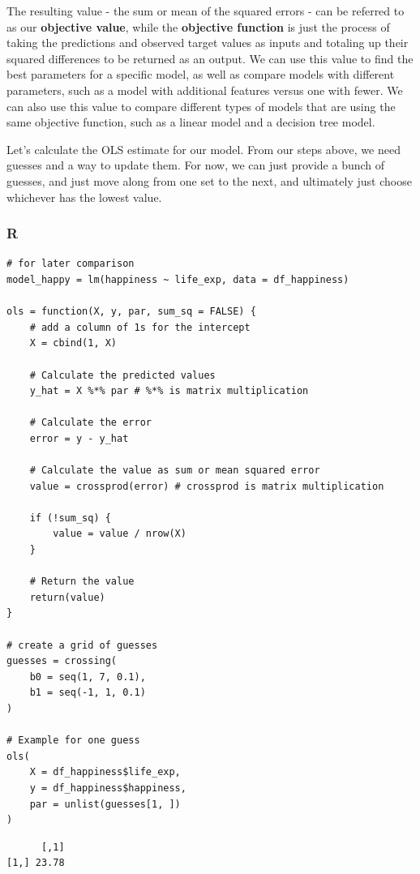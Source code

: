 \documentclass[
  letterpaper,
]{krantz}
\begin{document}
The resulting value - the sum or mean of the squared errors - can be
referred to as our \textbf{objective value}, while the \textbf{objective
function} is just the process of taking the predictions and observed
target values as inputs and totaling up their squared differences to be
returned as an output. We can use this value to find the best parameters
for a specific model, as well as compare models with different
parameters, such as a model with additional features versus one with
fewer. We can also use this value to compare different types of models
that are using the same objective function, such as a linear model and a
decision tree model.

Let's calculate the OLS estimate for our model. From our steps above, we
need guesses and a way to update them. For now, we can just provide a
bunch of guesses, and just move along from one set to the next, and
ultimately just choose whichever has the lowest value.

\subsubsection{R}

\begin{verbatim}
# for later comparison
model_happy = lm(happiness ~ life_exp, data = df_happiness)

ols = function(X, y, par, sum_sq = FALSE) {
    # add a column of 1s for the intercept
    X = cbind(1, X)

    # Calculate the predicted values
    y_hat = X %*% par # %*% is matrix multiplication

    # Calculate the error
    error = y - y_hat

    # Calculate the value as sum or mean squared error
    value = crossprod(error) # crossprod is matrix multiplication

    if (!sum_sq) {
        value = value / nrow(X)
    }

    # Return the value
    return(value)
}

# create a grid of guesses
guesses = crossing(
    b0 = seq(1, 7, 0.1),
    b1 = seq(-1, 1, 0.1)
)

# Example for one guess
ols(
    X = df_happiness$life_exp,
    y = df_happiness$happiness,
    par = unlist(guesses[1, ])
)
\end{verbatim}

\begin{verbatim}
      [,1]
[1,] 23.78
\end{verbatim}
\end{document}
